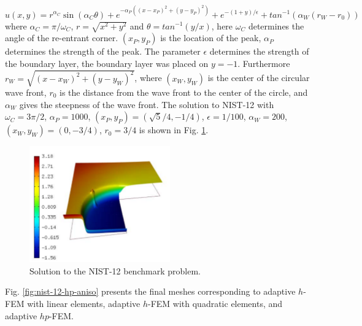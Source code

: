 \documentclass[12pt]{elsarticle}
\begin{document}
\[
u(x,y) =  r^{\alpha_{C} }\sin(\alpha_{C} \theta)
+ e^{-\alpha_{P} ((x - x_{P})^{2} + (y - y_{P})^{2})}
+ e^{-(1 + y) / \epsilon}
+ tan^{-1}(\alpha_{W} (r_{W} - r_{0}))
\]
where $\alpha_C = \pi / \omega_C$, $r = \sqrt{x^2+y^2}$
and $\theta = tan^{-1}(y/x)$, here $\omega_C$ determines
the angle of the re-entrant corner.
$(x_{P}, y_{P})$ is the location of the peak, $\alpha_{P}$
determines the strength of the peak.
The parameter $\epsilon$ determines the
strength of the boundary layer, the boundary layer was placed on $y = -1$.
Furthermore
$r_{W} = \sqrt{(x - x_{W})^{2} + (y - y_{W})^{2}}$,
where $(x_{W}, y_{W})$ is the center of the circular wave front,
$r_{0}$ is the distance from the wave front to the
center of the circle, and $\alpha_W$ gives
the steepness of the wave front.
The solution to NIST-12 with $\omega_C = 3 \pi /2$,
$\alpha_{P} = 1000$, $(x_{P}, y_{P}) = (\sqrt{5} / 4, -1/4)$,
$\epsilon = 1/100$,
$\alpha_{W} = 200$, $(x_{W}, y_{W}) = (0, -3/4)$, $r_{0} = 3/4$
is shown in Fig. \ref{fig:sln-nist12}.

\begin{figure}[H]
\centering
\includegraphics[height=5cm]{mafig71.pdf}
\caption{Solution to the NIST-12 benchmark problem.}
\label{fig:sln-nist12}
\end{figure}

Fig. \ref{fig:nist-12-hp-aniso} presents the final meshes corresponding to adaptive $h$-FEM with
linear elements, adaptive $h$-FEM with quadratic elements, and adaptive $hp$-FEM.
\end{document}
